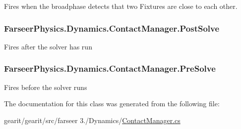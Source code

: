 Fires when the broadphase detects that two Fixtures are close to each other. 

\hypertarget{class_farseer_physics_1_1_dynamics_1_1_contact_manager_aea3a90b99f90864ebdaa6ebf6cda2b92}{
\subsubsection[{Post\+Solve}]{ Farseer\+Physics.\+Dynamics.\+Contact\+Manager.\+Post\+Solve}}\label{class_farseer_physics_1_1_dynamics_1_1_contact_manager_aea3a90b99f90864ebdaa6ebf6cda2b92}


Fires after the solver has run 

\hypertarget{class_farseer_physics_1_1_dynamics_1_1_contact_manager_a0ffed8f9877edd9db791dcc923f16cb1}{
\subsubsection[{Pre\+Solve}]{ Farseer\+Physics.\+Dynamics.\+Contact\+Manager.\+Pre\+Solve}}\label{class_farseer_physics_1_1_dynamics_1_1_contact_manager_a0ffed8f9877edd9db791dcc923f16cb1}


Fires before the solver runs 



The documentation for this class was generated from the following file\+:\begin{DoxyCompactItemize}
\item 
gearit/gearit/src/farseer 3./\+Dynamics/\hyperlink{_contact_manager_8cs}{Contact\+Manager.\+cs}\end{DoxyCompactItemize}

